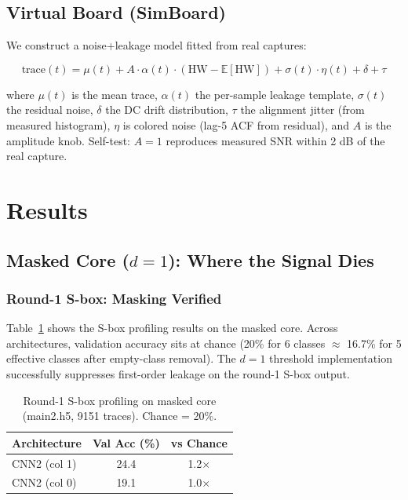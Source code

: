 \documentclass[a4paper,11pt,twocolumn]{article}
\begin{document}
\subsection{Virtual Board (SimBoard)}

We construct a noise+leakage model fitted from real captures:

\begin{equation}
\text{trace}(t) = \mu(t) + A \cdot \alpha(t) \cdot (\text{HW} - \mathbb{E}[\text{HW}]) + \sigma(t) \cdot \eta(t) + \delta + \tau
\end{equation}

where $\mu(t)$ is the mean trace, $\alpha(t)$ the per-sample leakage template, $\sigma(t)$ the residual noise, $\delta$ the DC drift distribution, $\tau$ the alignment jitter (from measured histogram), $\eta$ is colored noise (lag-5 ACF from residual), and $A$ is the amplitude knob. Self-test: $A=1$ reproduces measured SNR within 2 dB of the real capture.

\section{Results}

\subsection{Masked Core ($d=1$): Where the Signal Dies}

\subsubsection{Round-1 S-box: Masking Verified}

Table~\ref{tab:sbox_masked} shows the S-box profiling results on the masked core. Across architectures, validation accuracy sits at chance (20\% for 6 classes $\approx$ 16.7\% for 5 effective classes after empty-class removal). The $d=1$ threshold implementation successfully suppresses first-order leakage on the round-1 S-box output.

\begin{table}[t]
\centering
\caption{Round-1 S-box profiling on masked core (main2.h5, 9151 traces). Chance = 20\%.}
\label{tab:sbox_masked}
\begin{tabular}{lcc}
\toprule
Architecture & Val Acc (\%) & vs Chance \\
\midrule
CNN2 (col 1) & 24.4 & 1.2$\times$ \\
CNN2 (col 0) & 19.1 & 1.0$\times$ \\
\bottomrule
\end{tabular}
\end{table}
\end{document}
